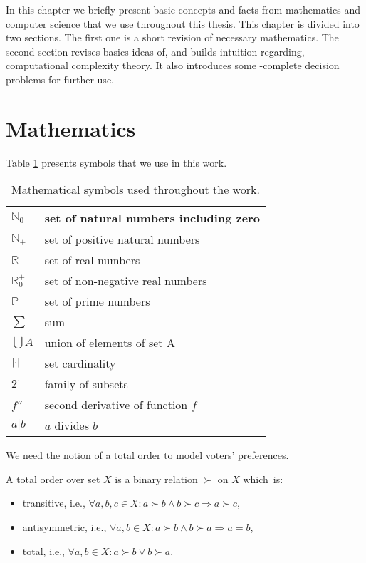 In this chapter we briefly present basic concepts and facts from mathematics and computer science
that we use throughout this thesis.
This chapter is divided into two sections.
The first one is a short revision of necessary mathematics.
The second section revises basics ideas of, and builds intuition regarding, computational complexity theory.
It also introduces some \np-complete decision problems for further use.


\section{Mathematics}

Table \ref{symbols} presents symbols that we use in this work.

\begin{table} \centering
\begin{tabular}{| l | l |} \hline
	$\mathbb{N}_0$	& set of natural numbers including zero \\ \hline
	$\mathbb{N}_+$	& set of positive natural numbers \\ \hline
	$\mathbb{R}$	& set of real numbers \\ \hline
	$\mathbb{R}_0^+$& set of non-negative real numbers \\ \hline
	$\mathbb{P}$	& set of prime numbers \\ \hline
	$\sum$			& sum \\ \hline 
	$\bigcup A$	& union of elements of set A\\ \hline
	$\left\vert \cdot \right\vert$	& set cardinality \\ \hline
	$2^\cdot$		& family of subsets \\ \hline
	$f''$			& second derivative of function $f$ \\ \hline
  	$ a | b$        & $a$ divides $b$ \\ \hline
\end{tabular}
\caption{Mathematical symbols used throughout the work.} \label{symbols}
\end{table}

We need the notion of a total order to model voters' preferences.

\begin{defn}
A total order over set $X$ is a binary relation $\succ$ on $X$ which~is:
\begin{itemize}
	\item transitive, i.e., $\forall a,b,c \in X: a \succ b \land b \succ c \Rightarrow a \succ c$,
	\item antisymmetric, i.e., $\forall a,b \in X: a \succ b \land b \succ a \Rightarrow a=b $,
	\item total, i.e., $\forall a,b \in X: a \succ b \lor b \succ a$.
\end{itemize}
\end{defn}

